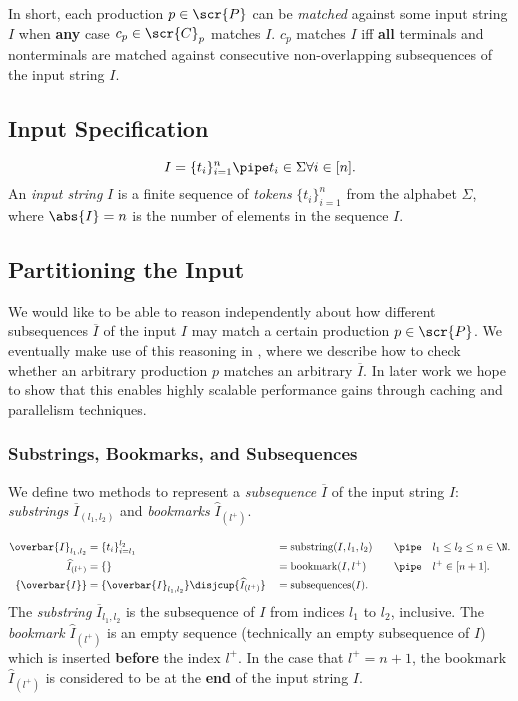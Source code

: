 \documentclass[10pt]{article}
\newcommand{\generalsubseq}{\overbar{I}}
\newcommand{\subseqset}{\{\generalsubseq\}}
\newcommand{\substringwith}[2]{\overbar{I}_{(#1,#2)}}
\newcommand{\canonicalleftend}{l_1}
\newcommand{\canonicalrightend}{l_2}
\newcommand{\canonicalsubstring}{\substringwith{\canonicalleftend}{\canonicalrightend}}
\newcommand{\bookmarkwith}[1]{\widehat{I}_{(#1)}}
\newcommand{\canonicalbookmarkindex}{l^+}
\newcommand{\canonicalbookmark}{\bookmarkwith{\canonicalbookmarkindex}}
\begin{document}
In short, each production $p \in \scr{P}$ can be \textit{matched} against some input string $I$ when \textbf{any} case $c_p \in \scr{C}_p$ matches $I$. $c_p$ matches $I$ iff \textbf{all} terminals and nonterminals are matched against consecutive non-overlapping subsequences of the input string $I$.

\subsection{Input Specification}
\label{sec:input-specification}
\begin{equation}
  \label{eq:input-string-tokens}
  I = \{t_i\}_{i=1}^n \pipe t_i \in \Sigma \forall i \in [n].
\end{equation}
An \textit{input string} $I$ is a finite sequence of \textit{tokens} $\{t_i\}_{i=1}^n$ from the alphabet $\Sigma$, where $\abs{I} = n$ is the number of elements in the sequence $I$.

\subsection{Partitioning the Input}
\label{sec:partitioning-the-input}
We would like to be able to reason independently about how different subsequences $\generalsubseq$ of the input $I$ may match a certain production $p \in \scr{P}$. We eventually make use of this reasoning in , where we describe how to check whether an arbitrary production $p$ matches an arbitrary $\generalsubseq$. In later work we hope to show that this enables highly scalable performance gains through caching and parallelism techniques.

\subsubsection{Substrings, Bookmarks, and Subsequences}
\label{sec:subsequences}
We define two methods to represent a \textit{subsequence} $\generalsubseq$ of the input string $I$: \textit{substrings} $\canonicalsubstring$ and \textit{bookmarks} $\canonicalbookmark$.

\begin{align}
  \label{eq:subsequences}
  \generalsubseq_{\canonicalleftend,l_2} &= \{t_i\}_{i=\canonicalleftend}^{l_2} &&= \text{substring}(I, \canonicalleftend, l_2) &&&\pipe &&&\canonicalleftend \le l_2 \le n \in \N. \\
  \canonicalbookmark &= \{\} &&= \text{bookmark}(I, \canonicalbookmarkindex) &&&\pipe &&&\canonicalbookmarkindex \in [n + 1]. \\
  \subseqset &= \{\generalsubseq_{\canonicalleftend,l_2}\} \disjcup \{\canonicalbookmark\} &&= \text{subsequences}(I).
\end{align}
The \textit{substring} $\generalsubseq_{\canonicalleftend,l_2}$ is the subsequence of $I$ from indices $\canonicalleftend$ to $l_2$, inclusive. The \textit{bookmark} $\canonicalbookmark$ is an empty sequence (technically an empty subsequence of $I$) which is inserted \textbf{before} the index $\canonicalbookmarkindex$. In the case that $\canonicalbookmarkindex = n + 1$, the bookmark $\canonicalbookmark$ is considered to be at the \textbf{end} of the input string $I$.
\end{document}
